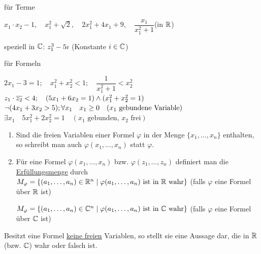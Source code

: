 \Bsp für Terme

$x_1\cdot x_2 - 1,\quad x_1^2+\sqrt{2},\quad 2x_1^2+4x_1+9,\quad \dfrac{x_1}{x_1^2+1}$\quad (in $\mathbb{R}$)

speziell in $\mathbb{C}$: $z_1^3-5\imath$ (Konstante $i\in\mathbb{C}$)

\Bsp für Formeln

$2x_1-3 = 1;\quad x_1^2+x_2^2<1;\quad\dfrac{1}{x_1^2+1}<x_2^2$\\
$z_1\cdot \overline{z_2} < 4;\quad (5x_1+6x_2=1)\land(x_1^2+x_2^2=1)$\\
$\neg(4x_1+3x_2>5);\\
\forall x_1\quad x_1\ge 0\quad (x_1 \text{ gebundene Variable})$\\
$\exists x_1\quad 5x_1^2+2x_2^2=1\quad (x_1\text{ gebunden, }x_2\text{ frei})$

\Def
\begin{enumerate}
	\item Sind die freien Variablen einer Formel $\varphi$ in der Menge $\{x_1,\ldots, x_n\}$ enthalten, so schreibt man auch $\varphi(x_1,\ldots, x_n)$ statt $\varphi$.
	\item Für eine Formel $\varphi(x_1,\ldots, x_n)$ bzw. $\varphi(z_1,\ldots, z_n)$ definiert man die \ul{Erfüllungsmenge} durch $M_\varphi = \{(a_1,\ldots, a_n)\in\mathbb{R}^n\mid\varphi(a_1,\ldots, a_n)\text{ ist in }\mathbb{R}\text{ wahr}\}$ (falls $\varphi$ eine Formel über $\mathbb{R}$ ist)
	
	$M_\varphi = \{(a_1,\ldots, a_n)\in\mathbb{C}^n\mid\varphi(a_1,\ldots, a_n)\text{ ist in }\mathbb{C}\text{ wahr}\}$ (falls $\varphi$ eine Formel über $\mathbb{C}$ ist)
\end{enumerate}

\Bem Besitzt eine Formel \ul{keine freien} Variablen, so stellt sie eine Aussage dar, die in $\mathbb{R}$ (bzw. $\mathbb{C}$) wahr oder falsch ist.

